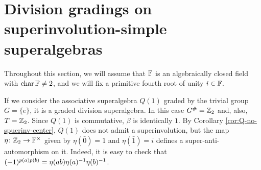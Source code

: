 

\section{Division gradings on superinvolution-simple\\ superalgebras}\label{sec:div-grads-on-sinv-simple}

Throughout this section, we will assume that $\mathbb{F}$ is an algebraically closed field with $\operatorname{char} \mathbb{F} \neq 2$, and we will fix a primitive fourth root of unity $i \in \mathbb{F}$.

\begin{ex}
    If we consider the associative superalgebra $Q(1)$ graded by the trivial group $G = \{e\}$, it is a graded division superalgebra. 
    In this case $G^\# = \mathbb{Z}_2$ and, also, $T = \mathbb{Z}_2$. 
    Since $Q(1)$ is commutative, $\beta$ is identically $1$.
    By Corollary \ref{cor:Q-no-spuerinv-center}, $Q(1)$ does not admit a superinvolution, but the map $\eta\colon \mathbb{Z}_2 \to \mathbb{F}^\times$ given by $\eta (\bar 0) = 1$ and $\eta( \bar 1) = i$ defines a super-anti-automorphism on it. 
    Indeed, it is easy to check that $(-1)^{p(a) p(b)} =  \eta(ab) \eta(a)^{-1} \eta(b)^{-1}$.
\end{ex}

